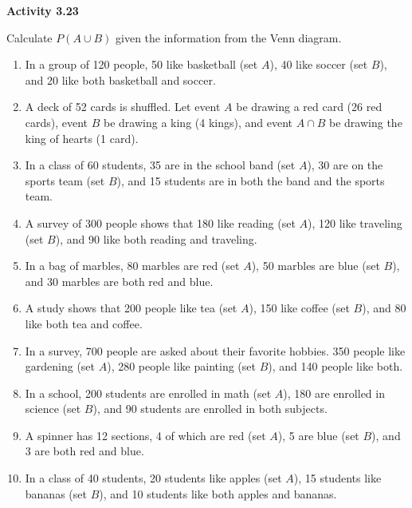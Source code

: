 \vspace{0.3ex}
\noindent\textbf{Activity 3.23}

\vspace{0.2ex}

Calculate \( P(A \cup B) \) given the information from the Venn diagram.

\begin{enumerate}[label=\color{blue}\arabic*.]
    \item In a group of 120 people, 50 like basketball (set \( A \)), 40 like soccer (set \( B \)), and 20 like both basketball and soccer.  
    \item A deck of 52 cards is shuffled. Let event \( A \) be drawing a red card (26 red cards), event \( B \) be drawing a king (4 kings), and event \( A \cap B \) be drawing the king of hearts (1 card).  
    \item In a class of 60 students, 35 are in the school band (set \( A \)), 30 are on the sports team (set \( B \)), and 15 students are in both the band and the sports team.  
    \item A survey of 300 people shows that 180 like reading (set \( A \)), 120 like traveling (set \( B \)), and 90 like both reading and traveling.  
    \item In a bag of marbles, 80 marbles are red (set \( A \)), 50 marbles are blue (set \( B \)), and 30 marbles are both red and blue.  
    \item A study shows that 200 people like tea (set \( A \)), 150 like coffee (set \( B \)), and 80 like both tea and coffee.  
    \item In a survey, 700 people are asked about their favorite hobbies. 350 people like gardening (set \( A \)), 280 people like painting (set \( B \)), and 140 people like both.  
    \item In a school, 200 students are enrolled in math (set \( A \)), 180 are enrolled in science (set \( B \)), and 90 students are enrolled in both subjects.  
    \item A spinner has 12 sections, 4 of which are red (set \( A \)), 5 are blue (set \( B \)), and 3 are both red and blue.  
    \item In a class of 40 students, 20 students like apples (set \( A \)), 15 students like bananas (set \( B \)), and 10 students like both apples and bananas.  
\end{enumerate}
